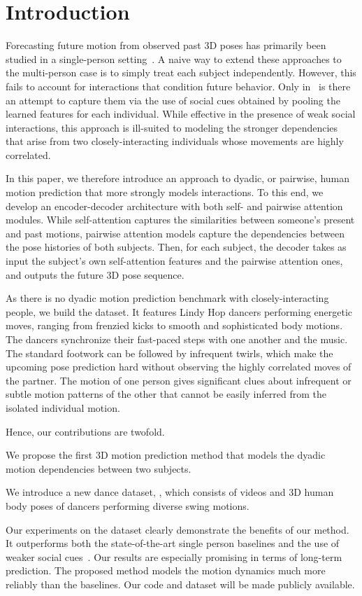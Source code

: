 \section{Introduction}

Forecasting future motion from observed past 3D poses has primarily been studied in a single-person setting~\cite{Li18k,Mao19,Mao20,Lebailly20,Lingwei21}. A naive way to extend these approaches to the multi-person case is to simply treat each subject independently. However, this fails to account for interactions that condition future behavior. Only in~\cite{Adeli20} is there an attempt to capture them via the use of social cues obtained by pooling the learned features  for each individual. While effective in the presence of weak social interactions, this approach is ill-suited to modeling the stronger dependencies that arise from two closely-interacting individuals whose movements are highly correlated.

In this paper, we therefore introduce an approach to dyadic, or pairwise, human motion prediction that more strongly models interactions. To this end, we develop an encoder-decoder architecture with both self- and pairwise attention modules. While self-attention captures the similarities between someone's present and past motions, pairwise attention models capture the dependencies between the pose histories of both subjects. Then, for each subject, the decoder takes as input the subject's own self-attention features and the pairwise attention ones, and outputs the future 3D pose sequence.

As there is no dyadic motion prediction benchmark with closely-interacting people, we build the \lindyhop{} dataset. It features Lindy Hop dancers performing  energetic moves, ranging from frenzied kicks to smooth and sophisticated body motions. The dancers synchronize their fast-paced steps with one another and the music. The standard footwork can be followed by infrequent twirls, which make the upcoming pose prediction hard without observing the highly correlated moves of the partner. The motion of one person gives significant clues about infrequent or subtle motion patterns of the other that cannot be easily inferred from the isolated individual motion.

Hence, our contributions are twofold.
%
\begin{compactitem} 

	\item We propose the first 3D motion prediction method that models the dyadic motion dependencies between two subjects.
	 
	\item We introduce a new dance dataset, \lindyhop{}, which consists of videos and 3D human body poses of dancers performing diverse swing motions.
	
\end{compactitem}
%
Our experiments on the \lindyhop{} dataset clearly demonstrate the benefits of our method. It outperforms both the state-of-the-art single person baselines and the use of weaker social cues~\cite{Adeli20}. Our results are especially promising in terms of long-term prediction. The proposed method models the motion dynamics much more reliably than the baselines. Our code and dataset will be made publicly available.
